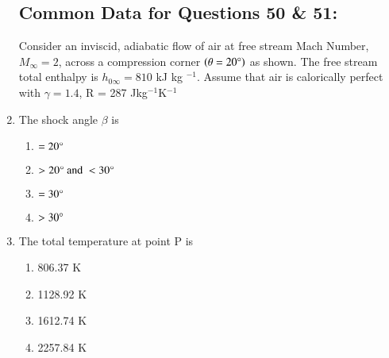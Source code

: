 \documentclass[journal]{IEEEtran}
\begin{document}
\begin{enumerate}
\subsection*{Common Data for Questions 50 \& 51:}
Consider an inviscid, adiabatic flow of air at free stream Mach Number, $M_{\infty} = 2$, across a compression corner $\left(\theta = 20 \degree\right)$ as shown. The free stream total enthalpy is $h_{0 \infty} = 810$ kJ kg $^{-1}$. Assume that air is calorically perfect with $\gamma = 1.4$, R = 287 Jkg$^{-1}$K$^{-1}$\\
\item The shock angle $\beta$ is
\begin{multicols}{2}
    \begin{enumerate}
        \item $=20 \degree$
        \item $>20 \degree \text{ and } <30 \degree$
        \item $ = 30 \degree$
        \item $>30 \degree$
    \end{enumerate}
\end{multicols}
\item The total temperature at point P is
\begin{multicols}{2}
    \begin{enumerate}
        \item 806.37 K
        \item 1128.92 K
        \item 1612.74 K
        \item 2257.84 K
    \end{enumerate}
\end{multicols}


\end{enumerate}
\end{document}
